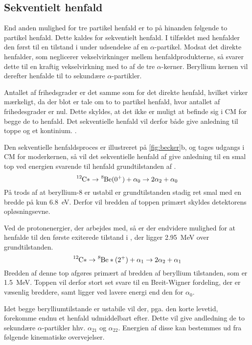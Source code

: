 \subsection{Sekventielt henfald}
\label{sec:sekventielt-henfald}

End anden mulighed for tre partikel henfald er to på hinanden følgende to partikel henfald. Dette
kaldes for sekventielt henfald. I tilfældet med \Carb henfalder den først til en tilstand i \Be
under udsendelse af en $\alpha$-partikel. Modsat det direkte henfalder, som neglicerer vekselvirkninger
mellem henfaldprodukterne, så svarer dette til en kraftig vekselvirkning med to af de tre
$\alpha$-kerner. Beryllium kernen vil derefter henfalde til to sekundære $\alpha$-partikler. 

Antallet af frihedsgrader er det samme som for det direkte henfald, hvilket virker mærkeligt, da der
blot er tale om to to partikel henfald, hvor antallet af frihedesgrader er nul. Dette skyldes, at
det ikke er muligt at befinde sig i CM for begge de to henfald. Det sekventielle henfald vil derfor
både give anledning til toppe og et kontinium. .


Den sekventielle henfaldsproces er illustreret på \cref{fig:becker}b, og tages udgangs i CM for
moderkernen, så vil det sekventielle henfald af \Carb give anledning til en smal top ved energien
svarende til henfald grundtilstanden af \Be.
\begin{equation}
  \label{eq:alpha0}
  \Carb* \rightarrow \Be(0^{+}) + \alpha_{0} \rightarrow 2\alpha_{2} + \alpha_{0}
\end{equation}
På trods af at beryllium-8 er ustabil er grundtilstanden stadig ret smal med en bredde på kun
\SI{6.8}{\eV}. Derfor vil bredden af toppen primært skyldes detektorens opløsningsevne. 

Ved de protonenergier, der arbejdes med, så er der endvidere mulighed for at henfalde til den første
exiterede tilstand i \Be, der ligger \SI{2.95}{\MeV} over grundtilstanden.
\begin{equation}
  \label{eq:alpha0}
  \Carb* \rightarrow \Be*(2^{+}) + \alpha_{1} \rightarrow 2\alpha_{2} + \alpha_{1}
\end{equation}
Bredden af denne top afgøres primært af bredden af beryllium tilstanden, som er
\SI{1.5}{\MeV}. Toppen vil derfor stort set svare til en Breit-Wigner fordeling, der er væsenlig
breddere, samt ligger ved lavere energi end den for $\alpha_{0}$.

Idet begge berylliumtilstande er ustabile vil der, pga. den korte levetid, forekomme endnu et
henfald udmiddelbart efter. Dette vil give andledning de to sekundære $\alpha$-partikler hhv.
$\alpha_{21}$ og $\alpha_{22}$. Energien af disse kan bestemmes ud fra følgende kinematiske overvejelser.
